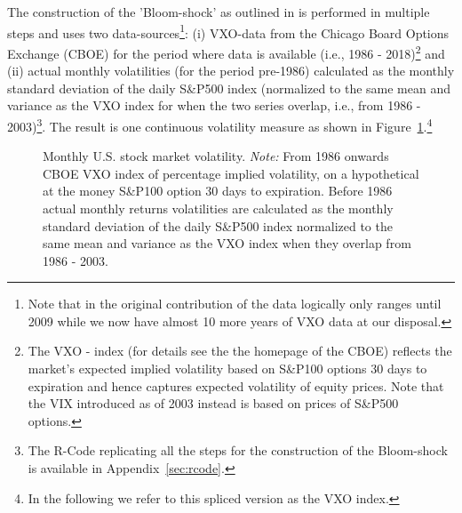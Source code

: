 \documentclass[a4paper,12pt,oneside,pointednumbers,bibtotoc,bigheadings,liststotoc]{scrbook}
\begin{document}
The construction of the 'Bloom-shock' as outlined in \citet{bloom:09} is performed in multiple steps and uses two data-sources\footnote{Note that in the original contribution of \citet{bloom:09} the data logically only ranges until 2009 while we now have almost 10 more years of VXO data at our disposal.}: (i) VXO-data from the Chicago Board Options Exchange (CBOE) for the period where data is available (i.e., 1986 - 2018)\footnote{The VXO - index (for details see the the homepage of the CBOE) reflects the market's expected implied volatility based on S\&P100 options 30 days to expiration and hence captures expected volatility of equity prices. Note that the VIX introduced as of 2003 instead is based on prices of S\&P500 options.} and (ii) actual monthly volatilities (for the period pre-1986) calculated as the monthly standard deviation of the daily S\&P500 index (normalized to the same mean and variance as the VXO index for when the two series overlap, i.e., from 1986 - 2003)\footnote{The R-Code replicating all the steps for the construction of the Bloom-shock is available in Appendix~\ref{sec:rcode}.}. The result is one continuous volatility measure as shown in Figure~\ref{fig:volatility}.\footnote{In the following we refer to this spliced version as the VXO index.}
\begin{figure}[!ht]
   \centering
   \setlength\fboxsep{0pt}
   \setlength\fboxrule{0pt}
      \caption[Monthly U.S. stock market volatility.]{Monthly U.S. stock market volatility.
      \textit{Note:} From 1986 onwards CBOE VXO index of percentage implied volatility, on a hypothetical at the money S\&P100 option 30 days to expiration. Before 1986 actual monthly returns volatilities are calculated as the monthly standard deviation of the daily S\&P500 index normalized to the same mean and variance as the VXO index when they overlap from 1986 - 2003.}
   \label{fig:volatility}
\end{figure}
\end{document}
